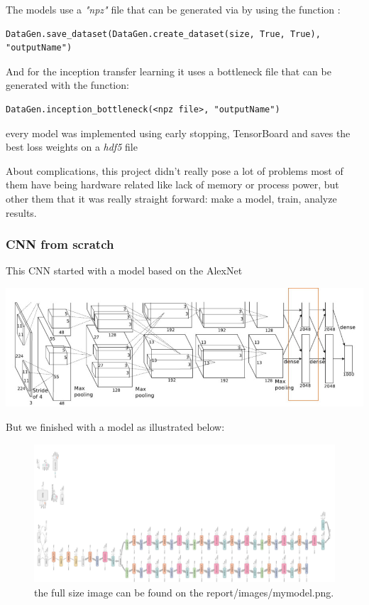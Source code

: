 \documentclass[11pt]{article}
\begin{document}
The models use a \emph{"npz"} file that can be generated via by using the function :
\begin{verbatim}
DataGen.save_dataset(DataGen.create_dataset(size, True, True), "outputName")
\end{verbatim}

And for the inception transfer learning it uses a bottleneck file that can be
generated with the function:

\begin{verbatim}
DataGen.inception_bottleneck(<npz file>, "outputName")
\end{verbatim}

every model was implemented using early stopping, TensorBoard and saves the
best loss weights on a \emph{hdf5} file   

About complications, this project didn't really pose a lot of problems most
of them have being hardware related like lack of memory or process power, but
other them that it was really straight forward: make a model, train, analyze results.


\pagebreak

\subsubsection{CNN from scratch}
\label{sec:org740b4c0}

This CNN started with a model based on the AlexNet \cite{krizhevsky2012imagenet} 
\begin{center}
\includegraphics[width=.9\linewidth]{./images/alexnet6.jpg}
\end{center}
But we finished with a model as illustrated below:
\begin{figure}[htbp]
\centering
\includegraphics[width=.9\linewidth]{./images/mymodel.png}
\caption{the full size image can be found on the report/images/mymodel.png.}
\end{figure}
\end{document}
